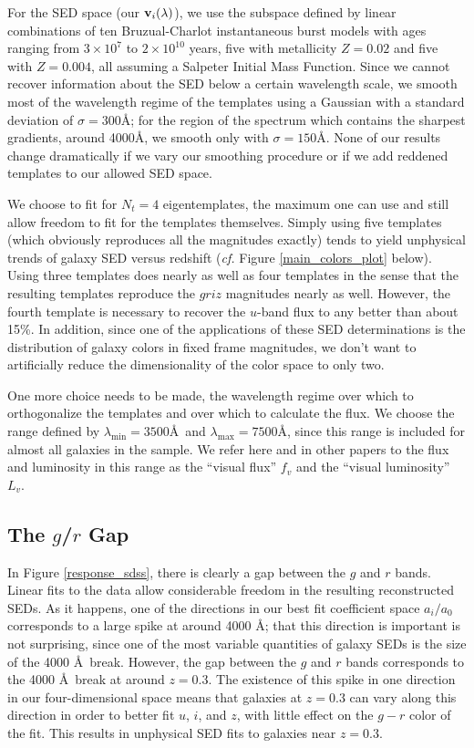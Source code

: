 \documentclass[10pt,preprint]{aastex}
\newcommand{\vv}[1]{{\bf #1}}
\begin{document}
For the SED space (our $\vv{v}_i(\lambda)$), we use the subspace
defined by linear combinations of ten Bruzual-Charlot instantaneous
burst models with ages ranging from $3 \times 10^7$ to $2\times
10^{10}$ years, five with metallicity $Z=0.02$ and five with
$Z=0.004$, all assuming a Salpeter Initial Mass Function. Since we
cannot recover information about the SED below a certain wavelength
scale, we smooth most of the wavelength regime of the templates using
a Gaussian with a standard deviation of $\sigma = 300$\AA; for the
region of the spectrum which contains the sharpest gradients, around
4000\AA, we smooth only with $\sigma = 150$\AA. None of our results
change dramatically if we vary our smoothing procedure or if we add
reddened templates to our allowed SED space.

We choose to fit for $N_t = 4$ eigentemplates, the maximum one can use
and still allow freedom to fit for the templates themselves.  Simply
using five templates (which obviously reproduces all the magnitudes
exactly) tends to yield unphysical trends of galaxy SED versus
redshift ({\it cf.}  Figure \ref{main_colors_plot} below). Using three
templates does nearly as well as four templates in the sense that the
resulting templates reproduce the $griz$ magnitudes nearly as
well. However, the fourth template is necessary to recover the
$u$-band flux to any better than about 15\%. In addition, since one of
the applications of these SED determinations is the distribution of
galaxy colors in fixed frame magnitudes, we don't want to artificially
reduce the dimensionality of the color space to only two.

One more choice needs to be made, the wavelength regime over which to
orthogonalize the templates and over which to calculate the flux. We
choose the range defined by $\lambda_{\mathrm{min}}=3500$\AA\ and
$\lambda_{\mathrm{max}}=7500$\AA, since this range is included for
almost all galaxies in the sample. We refer here and in other papers
to the flux and luminosity in this range as the ``visual flux'' $f_v$
and the ``visual luminosity'' $L_v$.

\subsection{The $g$/$r$ Gap}
\label{grgap}

In Figure \ref{response_sdss}, there is clearly a gap between the $g$
and $r$ bands. Linear fits to the data allow considerable freedom in
the resulting reconstructed SEDs. As it happens, one of the directions
in our best fit coefficient space $a_i/a_0$ corresponds to a large
spike at around 4000 \AA; that this direction is important is not
surprising, since one of the most variable quantities of galaxy SEDs is
the size of the 4000 \AA\ break. However, the gap between the $g$ and
$r$ bands corresponds to the 4000 \AA\ break at around $z=0.3$. The
existence of this spike in one direction in our four-dimensional space
means that galaxies at $z=0.3$ can vary along this direction in order
to better fit $u$, $i$, and $z$, with little effect on the $g-r$ color
of the fit. This results in unphysical SED fits to galaxies near
$z=0.3$. 
\end{document}
